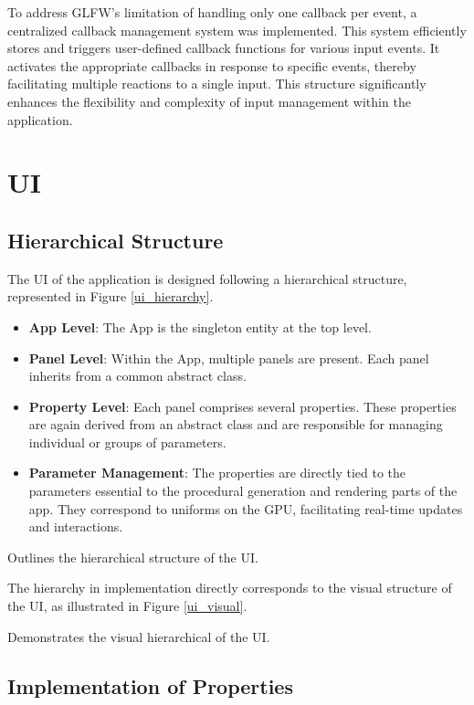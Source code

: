 To address GLFW's limitation of handling only one callback per event, a centralized callback management system was implemented. This system efficiently stores and triggers user-defined callback functions for various input events. It activates the appropriate callbacks in response to specific events, thereby facilitating multiple reactions to a single input. This structure significantly enhances the flexibility and complexity of input management within the application.

\section{UI}

\subsection{Hierarchical Structure}

The UI of the application is designed following a hierarchical structure, represented in Figure \ref{ui_hierarchy}.

\begin{itemize}
    \item \textbf{App Level}: The App is the singleton entity at the top level.
    \item \textbf{Panel Level}: Within the App, multiple panels are present. Each panel inherits from a common abstract class.
    \item \textbf{Property Level}: Each panel comprises several properties. These properties are again derived from an abstract class and are responsible for managing individual or groups of parameters.
    \item \textbf{Parameter Management}: The properties are directly tied to the parameters essential to the procedural generation and rendering parts of the app. They correspond to uniforms on the GPU, facilitating real-time updates and interactions.
\end{itemize}

{Outlines the hierarchical structure of the UI.}

The hierarchy in implementation directly corresponds to the visual structure of the UI, as illustrated in Figure \ref{ui_visual}.

{Demonstrates the visual hierarchical of the UI.}

\subsection{Implementation of Properties}

